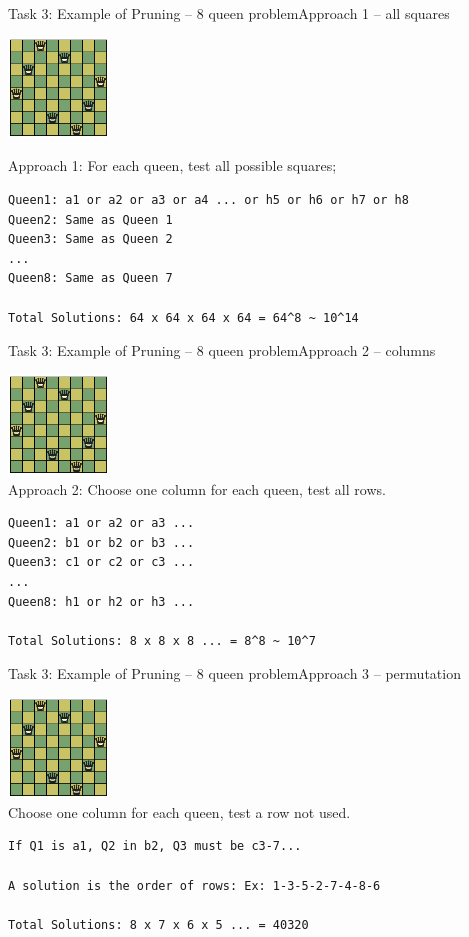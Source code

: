 \begin{frame}[fragile]{Task 3: Example of Pruning -- 8 queen problem}{Approach 1 -- all squares}

  \hfill \includegraphics[width=0.2\textwidth]{img/8queen}

  Approach 1: For each queen, test all possible squares;
  \bigskip

\begin{verbatim}
Queen1: a1 or a2 or a3 or a4 ... or h5 or h6 or h7 or h8
Queen2: Same as Queen 1
Queen3: Same as Queen 2
...
Queen8: Same as Queen 7

Total Solutions: 64 x 64 x 64 x 64 = 64^8 ~ 10^14
\end{verbatim}
\end{frame}

\begin{frame}[fragile]{Task 3: Example of Pruning -- 8 queen problem}{Approach 2 -- columns}

  \hfill \includegraphics[width=0.2\textwidth]{img/8queen}\\
  Approach 2: Choose one column for each queen, test all rows.
  \bigskip

\begin{verbatim}
Queen1: a1 or a2 or a3 ...
Queen2: b1 or b2 or b3 ...
Queen3: c1 or c2 or c3 ...
...
Queen8: h1 or h2 or h3 ...

Total Solutions: 8 x 8 x 8 ... = 8^8 ~ 10^7
\end{verbatim}
\end{frame}

\begin{frame}[fragile]{Task 3: Example of Pruning -- 8 queen problem}{Approach 3 -- permutation}

  \hfill \includegraphics[width=0.2\textwidth]{img/8queen}\\
  Choose one column for each queen, test a row not used.
  \bigskip

\begin{verbatim}
If Q1 is a1, Q2 in b2, Q3 must be c3-7...

A solution is the order of rows: Ex: 1-3-5-2-7-4-8-6

Total Solutions: 8 x 7 x 6 x 5 ... = 40320
\end{verbatim}
\end{frame}

